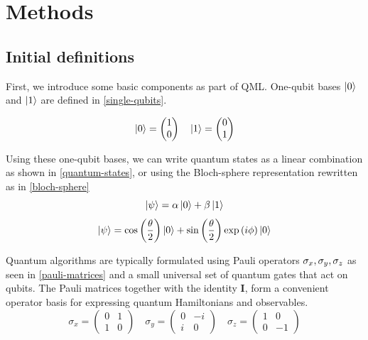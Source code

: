 \section{Methods}\label{section:methods}

\subsection{Initial definitions}

First, we introduce some basic components as part of QML. One-qubit bases $\left| 0 \right\rangle$ and $\left| 1 \right\rangle$ are defined in \cref{single-qubits}.

\begin{equation}\label{single-qubits}
    \left| 0 \right\rangle = \begin{pmatrix}
        1\\0
    \end{pmatrix}\quad
    \left| 1 \right\rangle = \begin{pmatrix}
        0\\1
    \end{pmatrix}
\end{equation}

Using these one-qubit bases, we can write quantum states as a linear combination as shown in \cref{quantum-states}, or using the Bloch-sphere representation rewritten as in \cref{bloch-sphere}
\begin{equation}\label{quantum-states}
    \left| \psi \right\rangle = \alpha\left| 0 \right\rangle+\beta\left| 1 \right\rangle
\end{equation}
\begin{equation}\label{bloch-sphere}
    \left| \psi \right\rangle=\cos\left(\frac{\theta}{2}\right)\left| 0 \right\rangle+\sin\left(\frac{\theta}{2}\right)\exp{(i\phi)}\left| 0 \right\rangle
\end{equation}

Quantum algorithms are typically formulated using Pauli operators $\sigma_x,\space\sigma_y,\space\sigma_z$ as seen in \cref{pauli-matrices} and a small universal set of quantum gates that act on qubits. The Pauli matrices together with the identity $\textbf{I}$, form a convenient operator basis for expressing quantum Hamiltonians and observables. 
\begin{equation}\label{pauli-matrices}
    \sigma_x=\begin{pmatrix}
        0&1\\1&0
    \end{pmatrix}\quad
    \sigma_y=\begin{pmatrix}
        0&-i\\i&0
    \end{pmatrix}\quad
    \sigma_z=\begin{pmatrix}
        1&0\\0&-1
    \end{pmatrix}
\end{equation}

